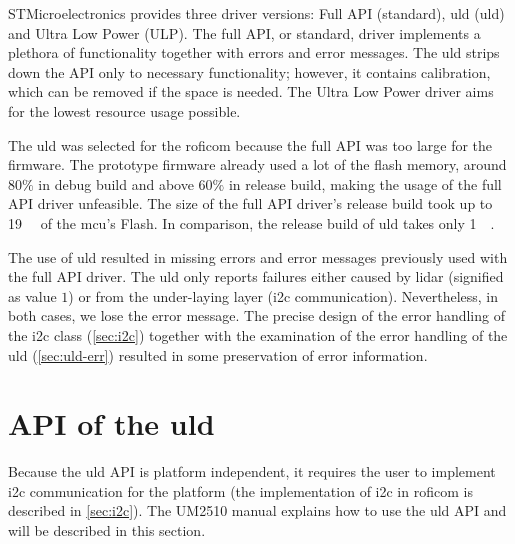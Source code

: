 \documentclass[
  digital,     %
  oneside,     %
  nosansbold,  %
  nocolorbold, %
  nolof,         %
  nolot,         %
]{fithesis4}
\begin{document}
STMicroelectronics provides three driver versions: Full API (standard), \acrlong{uld}
(\acrshort{uld}) and Ultra Low Power (ULP). The full API, or standard, driver implements a plethora
of functionality together with errors and error messages. The \acrlong{uld} strips down the API only
to necessary functionality; however, it contains calibration, which can be removed if the space is
needed. The Ultra Low Power driver aims for the lowest resource usage possible.

The \acrlong{uld} was selected for the \acrshort{roficom} because the full API was too large for the
firmware. The prototype firmware already used a lot of the flash memory, around $80\%$ in debug
build and above $60\%$ in release build, making the usage of the full API driver unfeasible. The
size of the full API driver's release build took up to \qty{19}{\kilo\byte} of the \acrshort{mcu}'s
Flash. In comparison, the release build of \acrlong{uld} takes only \qty{1}{\kilo\byte}. 

The use of \acrshort{uld} resulted in missing errors and error messages previously used with the
full API driver. The \acrshort{uld} only reports failures either caused by lidar (signified as value
$1$) or from the under-laying layer (\acrshort{i2c} communication). Nevertheless, in both cases, we
lose the error message. The precise design of the error handling of the \acrshort{i2c} class
(\autoref{sec:i2c}) together with the examination of the error handling of the \acrshort{uld}
(\autoref{sec:uld-err}) resulted in some preservation of error information.

\section[ API of the Ultra Lite Driver ]{ API of the \acrlong{uld} } \label{sec:lidar-api}
Because the \acrshort{uld} API is platform independent, it requires the user to implement
\acrshort{i2c} communication for the platform (the implementation of \acrshort{i2c} in
\acrshort{roficom} is described in \autoref{sec:i2c}). The UM2510 \cite{um2510} manual explains how
to use the \acrshort{uld} API and will be described in this section.
\end{document}
